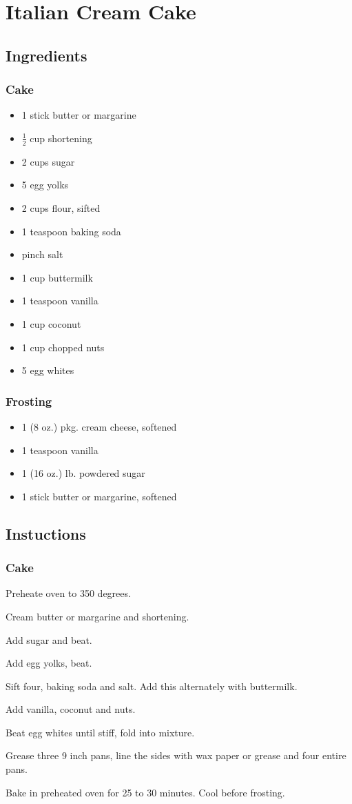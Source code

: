 \documentclass{book}
\begin{document}
\section*{Italian Cream Cake}
\subsection*{Ingredients}
\subsubsection*{Cake}
\begin{itemize}
\item
1 stick butter or margarine
\item
$\frac{1}{2}$ cup shortening
\item
2 cups sugar
\item
5 egg yolks
\item
2 cups flour, sifted
\item
1 teaspoon baking soda
\item
pinch salt
\item
1 cup buttermilk
\item
1 teaspoon vanilla
\item
1 cup coconut
\item
1 cup chopped nuts
\item
5 egg whites
\end{itemize}
\subsubsection*{Frosting}
\begin{itemize}
\item
1 (8 oz.) pkg. cream cheese, softened
\item
1 teaspoon vanilla
\item
1 (16 oz.) lb. powdered sugar
\item
1 stick butter or margarine, softened
\end{itemize}
\subsection*{Instuctions}
\subsubsection*{Cake}
\begin{numerize}
\item
Preheate oven to 350 degrees.
\item
Cream butter or margarine and shortening.
\item
Add sugar and beat.
\item
Add egg yolks, beat.
\item
Sift four, baking soda and salt. Add this alternately with buttermilk.
\item
Add vanilla, coconut and nuts.
\item
Beat egg whites until stiff, fold into mixture.
\item
Grease three 9 inch pans, line the sides with wax paper or grease and four entire pans.
\item
Bake in preheated oven for 25 to 30 minutes. Cool before frosting.
\end{numerize}
\end{document}
